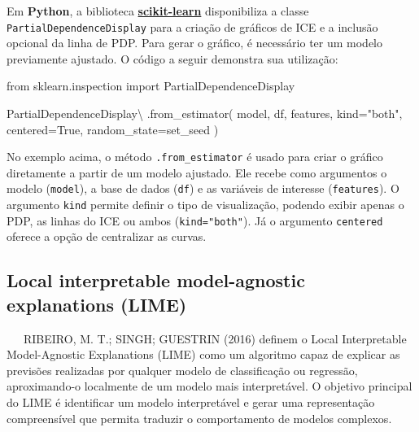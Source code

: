 \documentclass[
  12pt,
  a4paper,
]{scrreprt}
\newenvironment{Shaded}{}{}
\newcommand{\ImportTok}[1]{\textcolor[rgb]{0.01,0.18,0.38}{#1}}
\newcommand{\NormalTok}[1]{\textcolor[rgb]{0.14,0.16,0.18}{#1}}
\newcommand{\OperatorTok}[1]{\textcolor[rgb]{0.14,0.16,0.18}{#1}}
\newcommand{\StringTok}[1]{\textcolor[rgb]{0.01,0.18,0.38}{#1}}
\newcommand{\VariableTok}[1]{\textcolor[rgb]{0.89,0.38,0.04}{#1}}
\begin{document}
\vspace{12pt}

Em \textbf{Python}, a biblioteca
\href{https://scikit-learn.org/stable/}{\textbf{scikit-learn}}
disponibiliza a classe \texttt{PartialDependenceDisplay} para a criação
de gráficos de ICE e a inclusão opcional da linha de PDP. Para gerar o
gráfico, é necessário ter um modelo previamente ajustado. O código a
seguir demonstra sua utilização:

\begin{Shaded}
\begin{Highlighting}[]
\ImportTok{from}\NormalTok{ sklearn.inspection }\ImportTok{import}\NormalTok{ PartialDependenceDisplay}

\NormalTok{PartialDependenceDisplay}\OperatorTok{\textbackslash{}}
\NormalTok{    .from\_estimator(}
\NormalTok{        model,}
\NormalTok{        df,}
\NormalTok{        features,}
\NormalTok{        kind}\OperatorTok{=}\StringTok{"both"}\NormalTok{,}
\NormalTok{        centered}\OperatorTok{=}\VariableTok{True}\NormalTok{,}
\NormalTok{        random\_state}\OperatorTok{=}\NormalTok{set\_seed}
\NormalTok{    )}
\end{Highlighting}
\end{Shaded}

No exemplo acima, o método \texttt{.from\_estimator} é usado para criar
o gráfico diretamente a partir de um modelo ajustado. Ele recebe como
argumentos o modelo (\texttt{model}), a base de dados (\texttt{df}) e as
variáveis de interesse (\texttt{features}). O argumento \texttt{kind}
permite definir o tipo de visualização, podendo exibir apenas o PDP, as
linhas do ICE ou ambos (\texttt{kind="both"}). Já o argumento
\texttt{centered} oferece a opção de centralizar as curvas.

\subsection{Local interpretable model-agnostic explanations
(LIME)}\label{local-interpretable-model-agnostic-explanations-lime}

~~~RIBEIRO, M. T.; SINGH; GUESTRIN (2016) definem o Local Interpretable
Model-Agnostic Explanations (LIME) como um algoritmo capaz de explicar
as previsões realizadas por qualquer modelo de classificação ou
regressão, aproximando-o localmente de um modelo mais interpretável. O
objetivo principal do LIME é identificar um modelo interpretável e gerar
uma representação compreensível que permita traduzir o comportamento de
modelos complexos.
\end{document}
